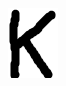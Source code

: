 \documentclass[russian,utf8,emptystyle]{eskdtext}
\begin{document}
\begin{figure}[!htb]
\includegraphics[width=\linewidth]{../data/learn/k/001}
\endminipage\hfill
{}

\end{figure}
\end{document}

